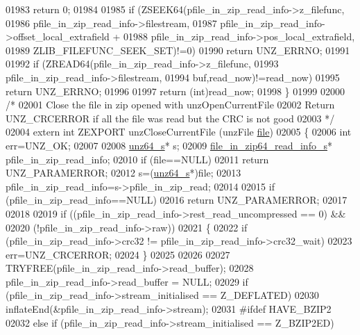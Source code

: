 \begin{DoxyCode}
01983         \textcolor{keywordflow}{return} 0;
01984 
01985     \textcolor{keywordflow}{if} (ZSEEK64(pfile\_in\_zip\_read\_info->z\_filefunc,
01986               pfile\_in\_zip\_read\_info->filestream,
01987               pfile\_in\_zip\_read\_info->offset\_local\_extrafield +
01988               pfile\_in\_zip\_read\_info->pos\_local\_extrafield,
01989               ZLIB\_FILEFUNC\_SEEK\_SET)!=0)
01990         \textcolor{keywordflow}{return} UNZ\_ERRNO;
01991 
01992     \textcolor{keywordflow}{if} (ZREAD64(pfile\_in\_zip\_read\_info->z\_filefunc,
01993               pfile\_in\_zip\_read\_info->filestream,
01994               buf,read\_now)!=read\_now)
01995         \textcolor{keywordflow}{return} UNZ\_ERRNO;
01996 
01997     \textcolor{keywordflow}{return} (\textcolor{keywordtype}{int})read\_now;
01998 \}
01999 
02000 \textcolor{comment}{/*}
02001 \textcolor{comment}{  Close the file in zip opened with unzOpenCurrentFile}
02002 \textcolor{comment}{  Return UNZ\_CRCERROR if all the file was read but the CRC is not good}
02003 \textcolor{comment}{*/}
02004 \textcolor{keyword}{extern} \textcolor{keywordtype}{int} ZEXPORT unzCloseCurrentFile (unzFile \hyperlink{structfile}{file})
02005 \{
02006     \textcolor{keywordtype}{int} err=UNZ\_OK;
02007 
02008     \hyperlink{structunz64__s}{unz64\_s}* s;
02009     \hyperlink{structfile__in__zip64__read__info__s}{file\_in\_zip64\_read\_info\_s}* pfile\_in\_zip\_read\_info;
02010     \textcolor{keywordflow}{if} (file==NULL)
02011         \textcolor{keywordflow}{return} UNZ\_PARAMERROR;
02012     s=(\hyperlink{structunz64__s}{unz64\_s}*)file;
02013     pfile\_in\_zip\_read\_info=s->pfile\_in\_zip\_read;
02014 
02015     \textcolor{keywordflow}{if} (pfile\_in\_zip\_read\_info==NULL)
02016         \textcolor{keywordflow}{return} UNZ\_PARAMERROR;
02017 
02018 
02019     \textcolor{keywordflow}{if} ((pfile\_in\_zip\_read\_info->rest\_read\_uncompressed == 0) &&
02020         (!pfile\_in\_zip\_read\_info->raw))
02021     \{
02022         \textcolor{keywordflow}{if} (pfile\_in\_zip\_read\_info->crc32 != pfile\_in\_zip\_read\_info->crc32\_wait)
02023             err=UNZ\_CRCERROR;
02024     \}
02025 
02026 
02027     TRYFREE(pfile\_in\_zip\_read\_info->read\_buffer);
02028     pfile\_in\_zip\_read\_info->read\_buffer = NULL;
02029     \textcolor{keywordflow}{if} (pfile\_in\_zip\_read\_info->stream\_initialised == Z\_DEFLATED)
02030         inflateEnd(&pfile\_in\_zip\_read\_info->stream);
02031 \textcolor{preprocessor}{#ifdef HAVE\_BZIP2}
02032     \textcolor{keywordflow}{else} \textcolor{keywordflow}{if} (pfile\_in\_zip\_read\_info->stream\_initialised == Z\_BZIP2ED)

\end{DoxyCode}
